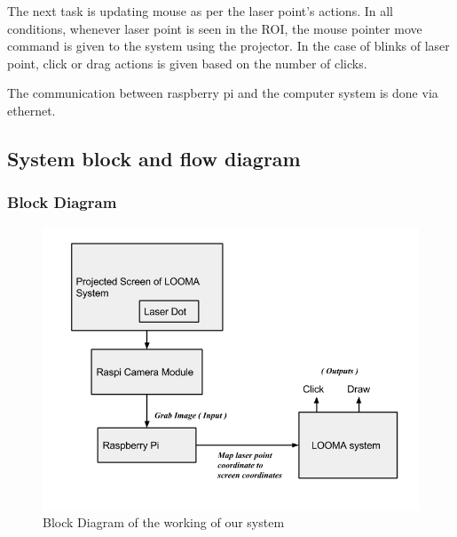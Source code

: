 \documentclass[12pt, a4paper]{article}
\begin{document}
The next task is updating mouse as per the laser point's actions. In all conditions, whenever laser point is seen in the ROI, the mouse pointer move command is given to the system using the projector. In the case of blinks of laser point, click or drag actions is given based on the number of clicks. 

The communication between raspberry pi and the computer system is done via ethernet.

\subsection{System block and flow diagram}
\subsubsection{Block Diagram}
\begin{figure}[htp]
\centering
\includegraphics[scale=0.45]{block_diagram.png}
\caption{Block Diagram of the working of our system}
\label{ }
\end{figure}
\end{document}
